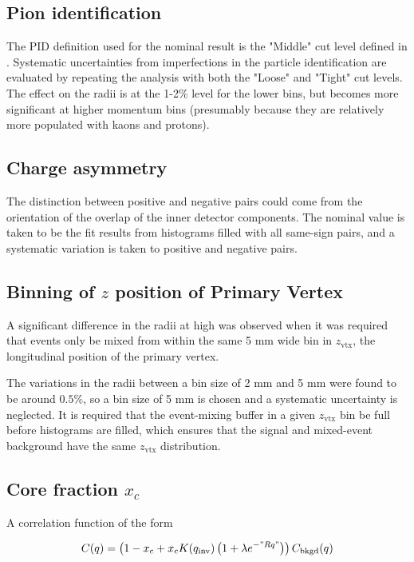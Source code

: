 \subsection{Pion identification}
The \ac{PID} definition used for the nominal result is the "Middle" cut level defined in .
Systematic uncertainties from imperfections in the particle identification are evaluated by repeating the analysis with both the "Loose" and "Tight" cut levels.
The effect on the radii is at the 1-2\% level for the lower \kt bins, but becomes more significant at higher momentum bins (presumably because they are relatively more populated with kaons and protons).

\subsection{Charge asymmetry}
The distinction between positive and negative pairs could come from the orientation of the overlap of the inner detector components.
The nominal value is taken to be the fit results from histograms filled with all same-sign pairs, and a systematic variation is taken to positive and negative pairs.

\subsection{Binning of $z$ position of Primary Vertex}
A significant difference in the radii at high \kt was observed when it was required that events only be mixed from within the same 5 mm wide bin in $z_\textrm{vtx}$, the longitudinal position of the primary vertex.

The variations in the radii between a bin size of 2 mm and 5 mm were found to be around $0.5 \%$, so a bin size of 5 mm is chosen and a systematic uncertainty is neglected.
It is required that the event-mixing buffer in a given $z_\textrm{vtx}$ bin be full before histograms are filled, which ensures that the signal and mixed-event background have the same $z_\textrm{vtx}$ distribution.

\subsection{Core fraction $x_c$}
A correlation function of the form

\begin{equation}
C(q) = \left(1-x_c + x_c K(q_{\mathrm{inv}})\left( 1 + \lambda e^{-"Rq"} \right) \right) C_{\textrm{bkgd}}(q)
\end{equation}

